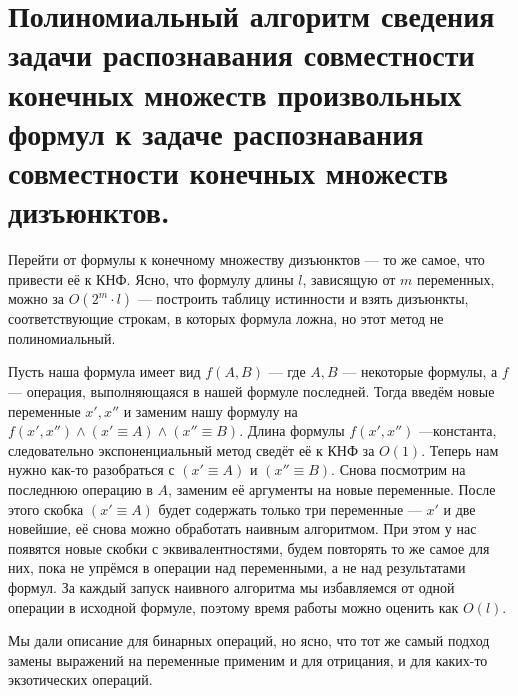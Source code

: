 \documentclass{article}
\begin{document}
\section{Полиномиальный алгоритм сведения задачи распознавания совместности конечных множеств произвольных формул к задаче распознавания совместности конечных множеств дизъюнктов.}
Перейти от формулы к конечному множеству дизъюнктов --- то же самое, что привести её к КНФ. Ясно, что формулу длины \(l\), зависящую от \(m\) переменных, можно за \(O(2^m \cdot l)\) --- построить таблицу истинности и взять дизъюнкты, соответствующие строкам, в которых формула ложна, но этот метод не полиномиальный.

Пусть наша формула имеет вид \(f(A, B)\) --- где \(A, B\) --- некоторые формулы, а \(f\) --- операция, выполняющаяся в нашей формуле последней. Тогда введём новые переменные \(x', x''\) и заменим нашу формулу на \(f(x', x'') \land (x' \equiv A) \land (x'' \equiv B)\). Длина формулы \(f(x', x'')\) ---константа, следовательно экспоненциальный метод сведёт её к КНФ за \(O(1)\). Теперь нам нужно как-то разобраться с \((x' \equiv A)\) и \((x'' \equiv B)\). Снова посмотрим на последнюю операцию в \(A\), заменим её аргументы на новые переменные. После этого скобка \((x' \equiv A)\) будет содержать только три переменные --- \(x'\) и две новейшие, её снова можно обработать наивным алгоритмом. При этом у нас появятся новые скобки с эквивалентностями, будем повторять то же самое для них, пока не упрёмся в операции над переменными, а не над результатами формул. За каждый запуск наивного алгоритма мы избавляемся от одной операции в исходной формуле, поэтому время работы можно оценить как \(O(l)\).

Мы дали описание для бинарных операций, но ясно, что тот же самый подход замены выражений на переменные применим и для отрицания, и для каких-то экзотических операций.
\end{document}

